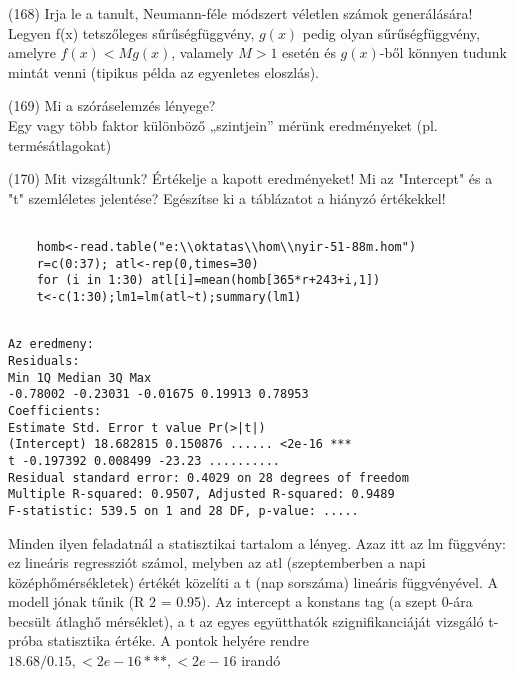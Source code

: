 \documentclass[12p]{article}
\begin{document}
(168) Irja le a tanult, Neumann-féle módszert véletlen számok generálására!\\
Legyen f(x) tetszőleges sűrűségfüggvény, $g(x)$ pedig olyan sűrűségfüggvény, amelyre $f(x) < Mg(x)$, valamely $M>1$ esetén és $g(x)$-ből könnyen tudunk mintát venni (tipikus példa az egyenletes eloszlás).

(169) Mi a szóráselemzés lényege?\\
Egy vagy több faktor különböző „szintjein” mérünk eredményeket (pl. termésátlagokat)


(170) Mit vizsgáltunk? Értékelje a kapott eredményeket! Mi az "Intercept" és a "t" szemléletes
jelentése? Egészítse ki a táblázatot a hiányzó értékekkel!

\begin{verbatim}

	homb<-read.table("e:\\oktatas\\hom\\nyir-51-88m.hom")
	r=c(0:37); atl<-rep(0,times=30)
	for (i in 1:30) atl[i]=mean(homb[365*r+243+i,1])
	t<-c(1:30);lm1=lm(atl~t);summary(lm1)
	
\end{verbatim}
\begin{verbatim}
Az eredmeny:
Residuals:
Min 1Q Median 3Q Max
-0.78002 -0.23031 -0.01675 0.19913 0.78953
Coefficients:
Estimate Std. Error t value Pr(>|t|)
(Intercept) 18.682815 0.150876 ...... <2e-16 ***
t -0.197392 0.008499 -23.23 ..........
Residual standard error: 0.4029 on 28 degrees of freedom
Multiple R-squared: 0.9507, Adjusted R-squared: 0.9489
F-statistic: 539.5 on 1 and 28 DF, p-value: .....
\end{verbatim}

Minden ilyen feladatnál a statisztikai tartalom a lényeg. Azaz itt az lm függvény: ez
lineáris regressziót számol, melyben az atl (szeptemberben a napi középhőmérsékletek) értékét közelíti a t (nap sorszáma) lineáris függvényével. A modell jónak tűnik (R
2 = 0.95). Az
intercept a konstans tag (a szept 0-ára becsült átlaghő mérséklet), a t az egyes együtthatók
szignifikanciáját vizsgáló t-próba statisztika értéke. A pontok helyére rendre $18.68/0.15, < 2e - 16 ***,
< 2e - 16$ irandó
\end{document}
